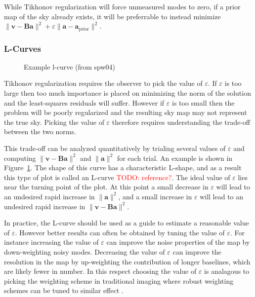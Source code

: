 \documentclass[twocolumn]{aastex6}
\renewcommand{\b}{\pmb}
\newcommand{\todo}[1]{\textcolor{red}{TODO: #1}\PackageWarning{TODO:}{#1!}}
\begin{document}
While Tikhonov regularization will force unmeasured modes to zero, if a prior map of the sky already
exists, it will be preferrable to instead minimize $\|\b v - \b B\b a\|^2 + \varepsilon \|\b a-\b
a_\text{prior}\|^2$.

\subsubsection{L-Curves}

\begin{figure}[t]
    \caption{
        Example l-curve (from spw04)
    }
    \label{fig:lcurve}
\end{figure}

Tikhonov regularization requires the observer to pick the value of $\varepsilon$. If $\varepsilon$
is too large then too much importance is placed on minimizing the norm of the solution and the
least-squares residuals will suffer. However if $\varepsilon$ is too small then the problem will be
poorly regularized and the resulting sky map may not represent the true sky. Picking the value of
$\varepsilon$ therefore requires understanding the trade-off between the two norms.

This trade-off can be analyzed quantitatively by trialing several values of $\varepsilon$ and
computing $\|\b v - \b B\b a\|^2$ and $\|\b a\|^2$ for each trial. An example is shown in
Figure~\ref{fig:lcurve}. The shape of this curve has a characteristic L-shape, and as a result this
type of plot is called an L-curve \todo{reference?}. The ideal value of $\varepsilon$ lies near the
turning point of the plot. At this point a small decrease in $\varepsilon$ will lead to an undesired
rapid increase in $\|\b a\|^2$, and a small increase in $\varepsilon$ will lead to an undesired
rapid increase in $\|\b v - \b B\b a\|^2$.

In practice, the L-curve should be used as a guide to estimate a reasonable value of $\varepsilon$.
However better results can often be obtained by tuning the value of $\varepsilon$. For instance
increasing the value of $\varepsilon$ can improve the noise properties of the map by down-weighting
noisy modes. Decreasing the value of $\varepsilon$ can improve the resolution in the map by
up-weighting the contribution of longer baselines, which are likely fewer in number. In this respect
choosing the value of $\varepsilon$ is analagous to picking the weighting scheme in traditional
imaging where robust weighting schemes can be tuned to similar effect \citep{briggs}.
\end{document}

